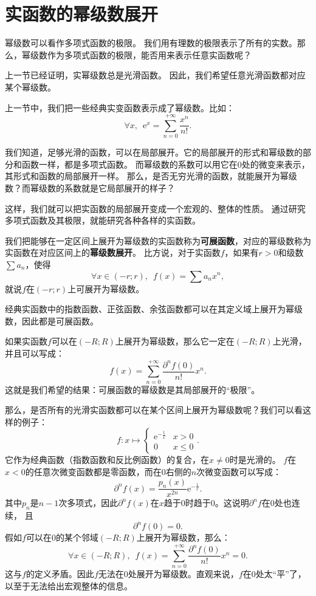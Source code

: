 \documentclass[12pt,UTF8,fontset=none]{ctexbook}
\begin{document}
\section{实函数的幂级数展开}

幂级数可以看作多项式函数的极限。
我们用有理数的极限表示了所有的实数。那么，幂级数作为多项式函数的极限，能否用来表示任意实函数呢？

上一节已经证明，实幂级数总是光滑函数。
因此，我们希望任意光滑函数都对应某个幂级数。

上一节中，我们把一些经典实变函数表示成了幂级数。比如：
$$ \forall x, \,\,\, \mathrm{e}^x = \sum_{n=0}^{+\infty} \frac{x^n}{n!}. $$

我们知道，足够光滑的函数，可以在局部展开。它的局部展开的形式和幂级数的部分和函数一样，都是多项式函数。
而幂级数的系数可以用它在$0$处的微变来表示，其形式和函数的局部展开一样。
那么，是否无穷光滑的函数，就能展开为幂级数？而幂级数的系数就是它局部展开的样子？

这样，我们就可以把实函数的局部展开变成一个宏观的、整体的性质。
通过研究多项式函数及其极限，就能研究各种各样的实函数。

我们把能够在一定区间上展开为幂级数的实函数称为\textbf{可展函数}，对应的幂级数称为实函数在对应区间上的\textbf{幂级数展开}。
比方说，对于实函数$f$，如果有$r>0$和级数$\sum a_n$，使得
$$\forall x\in (-r;r),\,\,\, f(x) = \sum a_n x^n,$$
就说$f$在$(-r;r)$上可展开为幂级数。

经典实函数中的指数函数、正弦函数、余弦函数都可以在其定义域上展开为幂级数，因此都是可展函数。

如果实函数$f$可以在$(-R;R)$上展开为幂级数，那么它一定在$(-R;R)$上光滑，并且可以写成：
$$ f(x) = \sum_{n=0}^{+\infty} \frac{\partial^n f(0)}{n!} x^n. $$
这就是我们希望的结果：可展函数的幂级数是其局部展开的“极限”。

那么，是否所有的光滑实函数都可以在某个区间上展开为幂级数呢？我们可以看这样的例子：
$$ f: x\mapsto \begin{cases} \mathrm{e}^{-\frac{1}{x}} & x > 0 \\ 0 & x \leqslant 0 \end{cases}.$$
它作为经典函数（指数函数和反比例函数）的复合，在$x\neq 0$时是光滑的。
$f$在$x<0$的任意次微变函数都是零函数，而在$0$右侧的$n$次微变函数可以写成：
$$ \partial^n f(x) = \frac{p_n(x)}{x^{2n}} \mathrm{e}^{-\frac{1}{x}}.$$
其中$p_n$是$n-1$次多项式，因此$\partial^n f(x)$在$x$趋于$0$时趋于$0$。这说明$\partial^n f$在$0$处也连续，
且
$$ \partial^n f(0) = 0.$$
假如$f$可以在$0$的某个邻域$(-R;R)$上展开为幂级数，那么：
$$ \forall x \in (-R;R) ,\,\,\, f(x) = \sum_{n=0}^{+\infty} \frac{\partial^n f(0)}{n!} x^n = 0. $$
这与$f$的定义矛盾。因此$f$无法在$0$处展开为幂级数。直观来说，$f$在$0$处太“平”了，以至于无法给出宏观整体的信息。
\end{document}
